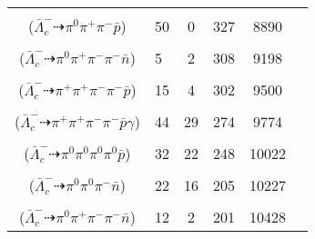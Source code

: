 \documentclass[landscape]{article}
\newcounter{rownumbers}
\newcommand\rn{\stepcounter{rownumbers}\arabic{rownumbers}}
\newcommand{\EOL}{\\} %
\newcommand{\topoTags}[1]{#1} %
\begin{document}
\begin{longtable}{clcccc}
\rn & \makecell[l]{ $ 
\bar{\Lambda}_{c}^{-} \rightarrow \pi^{0} K^{0} \bar{p} ,
K^{0} \rightarrow K_{S}^{0} ,
K_{S}^{0} \rightarrow \pi^{+} \pi^{-} 
$ \\ ($
\bar{\Lambda}_{c}^{-} \dashrightarrow \pi^{0} \pi^{+} \pi^{-} \bar{p} 
$) } & \topoTags{50 & 0 & }327 & 8890 \EOL

\rn & \makecell[l]{ $ 
\bar{\Lambda}_{c}^{-} \rightarrow \pi^{0} \pi^{-} \pi^{-} \bar{\Sigma}^{+} ,
\bar{\Sigma}^{+} \rightarrow \pi^{+} \bar{n} 
$ \\ ($
\bar{\Lambda}_{c}^{-} \dashrightarrow \pi^{0} \pi^{+} \pi^{-} \pi^{-} \bar{n} 
$) } & \topoTags{5 & 2 & }308 & 9198 \EOL

\rn & \makecell[l]{ $ 
\bar{\Lambda}_{c}^{-} \rightarrow \pi^{+} \pi^{-} K^{0} \bar{p} ,
K^{0} \rightarrow K_{S}^{0} ,
K_{S}^{0} \rightarrow \pi^{+} \pi^{-} 
$ \\ ($
\bar{\Lambda}_{c}^{-} \dashrightarrow \pi^{+} \pi^{+} \pi^{-} \pi^{-} \bar{p} 
$) } & \topoTags{15 & 4 & }302 & 9500 \EOL

\rn & \makecell[l]{ $ 
\bar{\Lambda}_{c}^{-} \rightarrow \pi^{+} \pi^{-} \pi^{-} \bar{\Sigma}^{0} ,
\bar{\Sigma}^{0} \rightarrow \bar{\Lambda} \gamma ,
\bar{\Lambda} \rightarrow \pi^{+} \bar{p} 
$ \\ ($
\bar{\Lambda}_{c}^{-} \dashrightarrow \pi^{+} \pi^{+} \pi^{-} \pi^{-} \bar{p} \gamma 
$) } & \topoTags{44 & 29 & }274 & 9774 \EOL

\rn & \makecell[l]{ $ 
\bar{\Lambda}_{c}^{-} \rightarrow \pi^{0} \pi^{0} K^{0} \bar{p} ,
K^{0} \rightarrow K_{S}^{0} ,
K_{S}^{0} \rightarrow \pi^{0} \pi^{0} 
$ \\ ($
\bar{\Lambda}_{c}^{-} \dashrightarrow \pi^{0} \pi^{0} \pi^{0} \pi^{0} \bar{p} 
$) } & \topoTags{32 & 22 & }248 & 10022 \EOL

\rn & \makecell[l]{ $ 
\bar{\Lambda}_{c}^{-} \rightarrow \pi^{0} \pi^{-} \bar{\Lambda} ,
\bar{\Lambda} \rightarrow \pi^{0} \bar{n} 
$ \\ ($
\bar{\Lambda}_{c}^{-} \dashrightarrow \pi^{0} \pi^{0} \pi^{-} \bar{n} 
$) } & \topoTags{22 & 16 & }205 & 10227 \EOL

\rn & \makecell[l]{ $ 
\bar{\Lambda}_{c}^{-} \rightarrow \pi^{+} \pi^{-} \pi^{-} \bar{\Lambda} ,
\bar{\Lambda} \rightarrow \pi^{0} \bar{n} 
$ \\ ($
\bar{\Lambda}_{c}^{-} \dashrightarrow \pi^{0} \pi^{+} \pi^{-} \pi^{-} \bar{n} 
$) } & \topoTags{12 & 2 & }201 & 10428 \EOL


\end{longtable}
\end{document}
